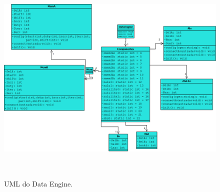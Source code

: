 \begin{figure}[!htb]
  \centering
  \includegraphics[height=105mm, angle=270, width=155mm]{Figures/tese_UML.png}
  \caption[UML do Data Engine.]{UML do Data Engine.}  
  \label{fig:tese_UML}
\end{figure}

\cleardoublepage
